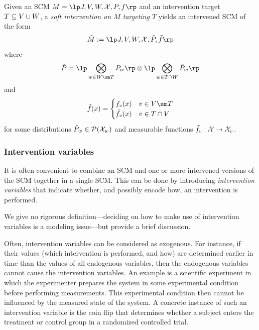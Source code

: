 \begin{Def}\label{def:scm_soft_intervention}
  Given an SCM $M = \lt \Sin, \Send, \Srnd, \CX, P, f \rt$
  and an intervention target $T \subseteq V \cup W$, a \emph{soft intervention on $M$ targeting $T$}
  yields an intervened SCM of the form
  $$\tilde{M} := \lt \Sin,\Send,\Srnd,\CX,\tilde{P},\tilde{f} \rt$$
  where
  $$\tilde{P} = \lp\bigotimes_{w \in \Srnd \sm T} P_w \rp \otimes \lp \bigotimes_{w \in T \cap \Srnd} \tilde{P}_w \rp$$
  and
  $$\tilde{f}(x) = \begin{cases} 
      f_v(x) & v \in \Send\sm T \\
      \tilde{f}_v(x) & v \in T \cap \Send \\
  \end{cases}$$
  for some distributions $\tilde{P}_w \in \mathcal{P}(\mathcal{X}_w)$ and measurable functions $\tilde{f}_v : \mathcal{X} \to \mathcal{X}_v$.
\end{Def}

\subsubsection{Intervention variables}

It is often convenient to combine an SCM and one or more intervened versions of the SCM together in a single SCM.
This can be done by introducing \emph{intervention variables} that indicate whether, and possibly encode how, an intervention is performed.

We give no rigorous definition---deciding on how to make use of intervention variables is a modeling issue---but provide a brief discussion.

Often, intervention variables can be considered as exogenous. 
For instance, if their values (which intervention is performed, and how) are determined earlier in time than the values of all endogenous variables, then the endogenous variables cannot cause the intervention variables. 
An example is a scientific experiment in which the experimenter prepares the system in some experimental condition before performing measurements. 
This experimental condition then cannot be influenced by the measured state of the system.  
A concrete instance of such an intervention variable is the coin flip that determines whether a subject enters the treatment or control group in a randomized controlled trial.  

